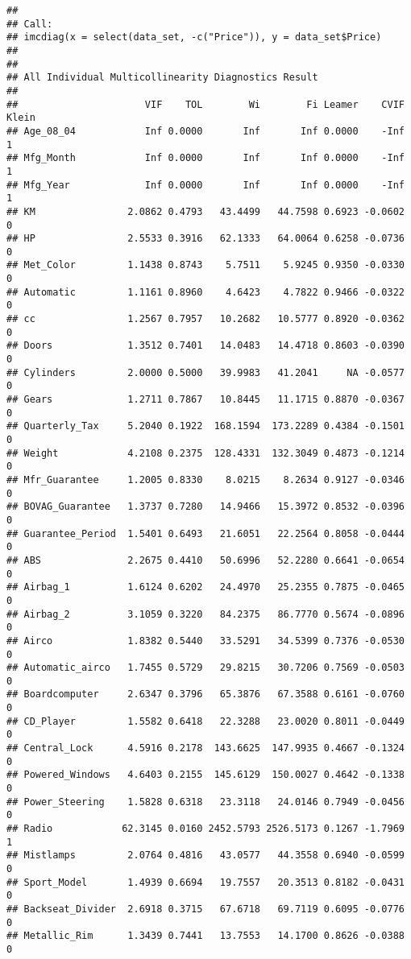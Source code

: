 \documentclass[]{article}
\begin{document}
\begin{verbatim}
## 
## Call:
## imcdiag(x = select(data_set, -c("Price")), y = data_set$Price)
## 
## 
## All Individual Multicollinearity Diagnostics Result
## 
##                      VIF    TOL        Wi        Fi Leamer    CVIF Klein
## Age_08_04            Inf 0.0000       Inf       Inf 0.0000    -Inf     1
## Mfg_Month            Inf 0.0000       Inf       Inf 0.0000    -Inf     1
## Mfg_Year             Inf 0.0000       Inf       Inf 0.0000    -Inf     1
## KM                2.0862 0.4793   43.4499   44.7598 0.6923 -0.0602     0
## HP                2.5533 0.3916   62.1333   64.0064 0.6258 -0.0736     0
## Met_Color         1.1438 0.8743    5.7511    5.9245 0.9350 -0.0330     0
## Automatic         1.1161 0.8960    4.6423    4.7822 0.9466 -0.0322     0
## cc                1.2567 0.7957   10.2682   10.5777 0.8920 -0.0362     0
## Doors             1.3512 0.7401   14.0483   14.4718 0.8603 -0.0390     0
## Cylinders         2.0000 0.5000   39.9983   41.2041     NA -0.0577     0
## Gears             1.2711 0.7867   10.8445   11.1715 0.8870 -0.0367     0
## Quarterly_Tax     5.2040 0.1922  168.1594  173.2289 0.4384 -0.1501     0
## Weight            4.2108 0.2375  128.4331  132.3049 0.4873 -0.1214     0
## Mfr_Guarantee     1.2005 0.8330    8.0215    8.2634 0.9127 -0.0346     0
## BOVAG_Guarantee   1.3737 0.7280   14.9466   15.3972 0.8532 -0.0396     0
## Guarantee_Period  1.5401 0.6493   21.6051   22.2564 0.8058 -0.0444     0
## ABS               2.2675 0.4410   50.6996   52.2280 0.6641 -0.0654     0
## Airbag_1          1.6124 0.6202   24.4970   25.2355 0.7875 -0.0465     0
## Airbag_2          3.1059 0.3220   84.2375   86.7770 0.5674 -0.0896     0
## Airco             1.8382 0.5440   33.5291   34.5399 0.7376 -0.0530     0
## Automatic_airco   1.7455 0.5729   29.8215   30.7206 0.7569 -0.0503     0
## Boardcomputer     2.6347 0.3796   65.3876   67.3588 0.6161 -0.0760     0
## CD_Player         1.5582 0.6418   22.3288   23.0020 0.8011 -0.0449     0
## Central_Lock      4.5916 0.2178  143.6625  147.9935 0.4667 -0.1324     0
## Powered_Windows   4.6403 0.2155  145.6129  150.0027 0.4642 -0.1338     0
## Power_Steering    1.5828 0.6318   23.3118   24.0146 0.7949 -0.0456     0
## Radio            62.3145 0.0160 2452.5793 2526.5173 0.1267 -1.7969     1
## Mistlamps         2.0764 0.4816   43.0577   44.3558 0.6940 -0.0599     0
## Sport_Model       1.4939 0.6694   19.7557   20.3513 0.8182 -0.0431     0
## Backseat_Divider  2.6918 0.3715   67.6718   69.7119 0.6095 -0.0776     0
## Metallic_Rim      1.3439 0.7441   13.7553   14.1700 0.8626 -0.0388     0

\end{verbatim}
\end{document}

